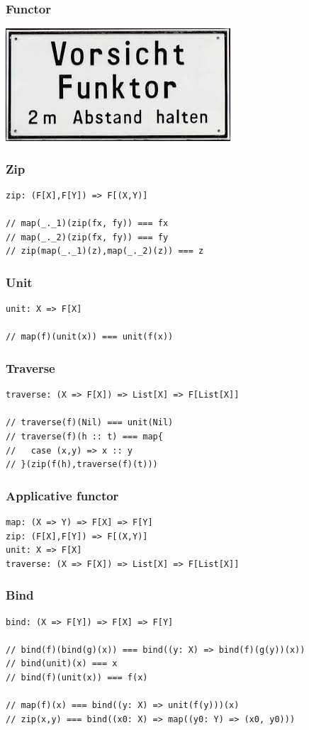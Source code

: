 \documentclass{beamer}
\begin{document}
\begin{frame}
\frametitle{Functor}
\includegraphics{funktor.jpeg}
\end{frame}

\begin{frame}[fragile]
\frametitle{Zip}
\begin{lstlisting}
zip: (F[X],F[Y]) => F[(X,Y)]

// map(_._1)(zip(fx, fy)) === fx
// map(_._2)(zip(fx, fy)) === fy
// zip(map(_._1)(z),map(_._2)(z)) === z
\end{lstlisting}
\end{frame}

\begin{frame}[fragile]
\frametitle{Unit}
\begin{lstlisting}
unit: X => F[X]

// map(f)(unit(x)) === unit(f(x))
\end{lstlisting}
\end{frame}

\begin{frame}[fragile]
\frametitle{Traverse}
\begin{lstlisting}
traverse: (X => F[X]) => List[X] => F[List[X]]

// traverse(f)(Nil) === unit(Nil)
// traverse(f)(h :: t) === map{
//   case (x,y) => x :: y
// }(zip(f(h),traverse(f)(t)))
\end{lstlisting}
\end{frame}

\begin{frame}[fragile]
\frametitle{Applicative functor}
\begin{lstlisting}
map: (X => Y) => F[X] => F[Y]
zip: (F[X],F[Y]) => F[(X,Y)]
unit: X => F[X]
traverse: (X => F[X]) => List[X] => F[List[X]]
\end{lstlisting}
\end{frame}

\begin{frame}[fragile]
\frametitle{Bind}
\begin{lstlisting}
bind: (X => F[Y]) => F[X] => F[Y]

// bind(f)(bind(g)(x)) === bind((y: X) => bind(f)(g(y))(x))
// bind(unit)(x) === x
// bind(f)(unit(x)) === f(x)

// map(f)(x) === bind((y: X) => unit(f(y)))(x)
// zip(x,y) === bind((x0: X) => map((y0: Y) => (x0, y0)))
\end{lstlisting}
\end{frame}
\end{document}
